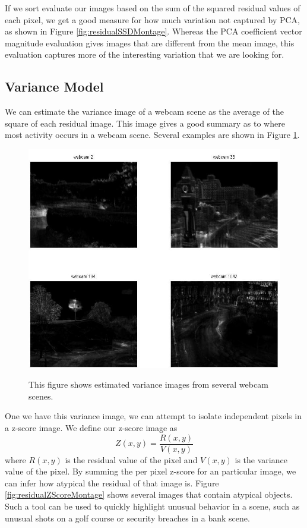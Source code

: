 If we sort evaluate our images based on the sum of the squared residual values of each pixel, we get a good measure for how much variation not captured by PCA, as shown in Figure \ref{fig:residualSSDMontage}.  Whereas the PCA coefficient vector magnitude evaluation gives images that are different from the mean image, this evaluation captures more of the interesting variation that we are looking for.


\subsection{Variance Model}

We can estimate the variance image of a webcam scene as the average of the square of each residual image.  This image gives a good summary as to where most activity occurs in a webcam scene.  Several examples are shown in Figure \ref{fig:severalVarianceImages}.

\begin{figure}
	\centering
		\includegraphics[width=1\textwidth]{figures/severalVarianceImages.jpg}
	\label{fig:severalVarianceImages}
	
		\caption[Several variance images.]{This figure shows estimated variance images from several webcam scenes.}
\end{figure}

One we have this variance image, we can attempt to isolate independent pixels in a z-score image.  We define our z-score image as $$Z(x,y) = \frac{R(x,y)} { V(x,y)}$$ where $R(x,y)$ is the residual value of the pixel and $V(x,y)$ is the variance value of the pixel.  By summing the per pixel z-score for an particular image, we can infer how atypical the residual of that image is.  Figure \ref{fig:residualZScoreMontage} shows several images that contain atypical objects.  Such a tool can be used to quickly highlight unusual behavior in a scene, such as unusual shots on a golf course or security breaches in a bank scene.

